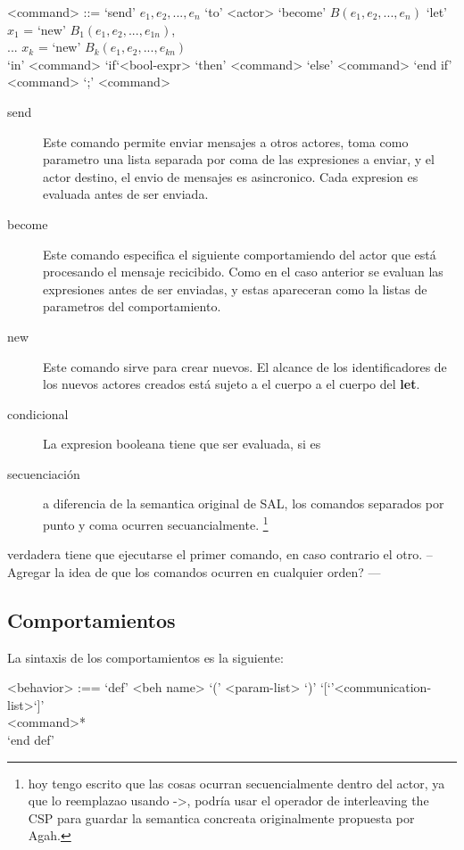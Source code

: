 \documentclass[fleqn]{article}
\begin{document}
\begin{grammar}
  <command> ::= `send' $e_1, e_2, ..., e_n$ `to' <actor>  
  \alt `become' $B(e_1, e_2, ..., e_n)$
  \alt `let' $x_1$ = `new' $B_1(e_1, e_2, ..., e_{1n})$, \\
  ... $x_k$ = `new' $B_k(e_1, e_2, ..., e_{kn})$        \\
  `in' <command> 
  \alt`if`<bool-expr> `then' <command> `else' <command> `end if' 
  \alt<command> `;' <command>
\end{grammar}

\begin{description}
\item [send]  Este comando permite enviar mensajes a otros actores, toma como
  parametro una lista separada por coma de las expresiones a enviar, y el actor
  destino, el envio de mensajes es asincronico. Cada expresion es evaluada antes
  de ser enviada.
\item [become] Este comando especifica el siguiente comportamiendo del actor
  que está procesando el mensaje recicibido. Como en el caso anterior se evaluan
  las expresiones antes de ser enviadas, y estas apareceran como la listas de
  parametros del comportamiento. 
\item[new] Este comando sirve para crear nuevos. El alcance de los
  identificadores de los nuevos actores creados está sujeto a el cuerpo a
  el cuerpo del \textbf{let}.
\item[condicional] La expresion booleana tiene que ser evaluada, si es
\item[secuenciación] a diferencia de la semantica original de SAL, los
  comandos separados por punto y coma ocurren secuancialmente. \footnote{hoy
    tengo escrito que las cosas ocurran secuencialmente dentro del actor, ya que
  lo reemplazao usando ->, podría usar el operador de interleaving the CSP para
  guardar la semantica concreata originalmente propuesta por Agah.}
\end{description}
  verdadera tiene que ejecutarse el primer comando, en caso contrario el otro.
-- Agregar la idea de que los comandos ocurren en cualquier orden? ---

\subsection{Comportamientos}

La sintaxis de los comportamientos es la siguiente:

\begin{grammar}
  <behavior> :== `def' <beh name> `(' <param-list> `)' `[`'<communication-list>`]' \\
            <command>* \\
  `end def'
\end{grammar}
\end{document}
